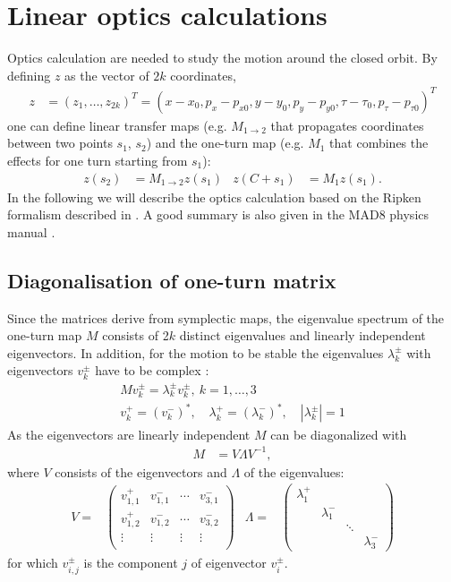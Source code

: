 \section{Linear optics calculations}
\label{opt}
Optics calculation are needed to study the motion around the closed orbit. By defining $z$ as the vector of $2 k$ coordinates,  
\begin{align}\label{opt:eqn:1}
z&=(z_1,\ldots,z_{2k})^T=(x-x_0,p_x-p_{x0},y-y_0,p_y-p_{y0},\tau-\tau_0,p_\tau-p_{\tau0})^T
\end{align}
one can define linear transfer maps (e.g. $M_{1\to 2}$ that propagates coordinates between two points $s_1$, $s_2$) and the one-turn map (e.g. $M_1$ that combines the effects for one turn starting from $s_1$):
\begin{align}\label{opt:eqn:2}
z(s_2)&= M_{1\to 2} z(s_1) & z(C+s_1) &= M_1 z(s_1).
\end{align}
In the following we will describe the optics calculation based on the Ripken formalism described in \cite{willeke88}. A good summary is also given in the MAD8 physics manual \cite{mad8phys}.

\subsection{Diagonalisation of one-turn matrix}
\label{opt:sec:1}
Since the matrices derive from symplectic maps, the eigenvalue spectrum of the one-turn map $M$ consists of 2$k$ distinct eigenvalues and linearly independent eigenvectors. In addition, for the motion to be stable the eigenvalues $\lambda_k^{\pm}$ with eigenvectors $v_k^{\pm}$ have to be complex \cite{willeke88}:
\begin{align}
M v_k^\pm  =  \lambda_k^\pm v_k^\pm, \ k=1,\ldots, 3 \\
v_k^+=(v_k^-)^*, \quad \lambda_k^+=(\lambda_k^-)^*, \quad |\lambda_k^{\pm}|=1
\end{align}
As the eigenvectors are linearly independent $M$ can be diagonalized with
\begin{align}
M &= V \Lambda V^{-1},
\end{align}
where $V$ consists of the eigenvectors and $\Lambda$ of the eigenvalues:
\begin{align}
V=&\left(
\begin{array}{cccc}
v^+_{1,1} & v^-_{1,1} & \cdots & v^-_{3,1}\\
v^+_{1,2} & v^-_{1,2} & \cdots & v^-_{3,2}\\
\vdots    & \vdots    & \vdots & \vdots \\
\end{array}
\right)  &
\Lambda=&\left(
\begin{array}{cccc}
\lambda^+_1 &    & &\\
& \lambda^-_1 & &\\
& & \ddots & \\
& & & \lambda^-_3
\end{array}
\right)
\end{align}
for which $v^{\pm}_{i,j}$ is the component $j$ of eigenvector $v_i^{\pm}$.

